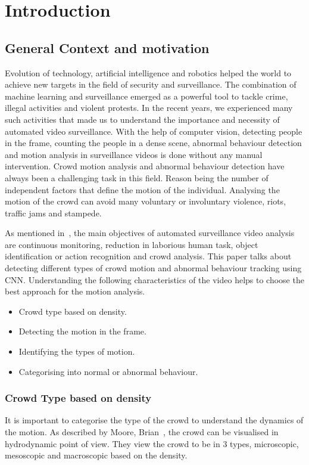 \chapter{Introduction}
\section{General Context and motivation}
Evolution of technology, artificial intelligence and robotics helped the world to achieve new targets in the
field of security and surveillance. The combination of machine learning and surveillance emerged as a
powerful tool to tackle crime, illegal activities and violent protests. In the recent years, we experienced 
many such activities that made us to understand the importance and necessity of automated video 
surveillance. With the help of computer vision, detecting people in the frame, counting the people in a 
dense scene, abnormal behaviour detection and motion analysis in surveillance videos is done without 
any manual intervention. Crowd motion analysis and abnormal behaviour detection have always been a 
challenging task in this field. Reason being the number of independent factors that define the motion of 
the individual. Analysing the motion of the crowd can avoid many voluntary or involuntary violence, riots, 
traffic jams and stampede.

As mentioned in~\cite{sreenu2019intelligent}, the main objectives of automated surveillance video 
analysis are continuous monitoring, reduction in laborious human task, object identification or action 
recognition and crowd analysis. This paper talks about detecting different types of crowd motion and abnormal behaviour tracking using CNN. Understanding the following characteristics of the video helps to choose the best approach for the motion analysis.
\begin{itemize}
	\item Crowd type based on density.
	\item Detecting the motion in the frame.
	\item Identifying the types of motion.
	\item Categorising into normal or abnormal behaviour.
\end{itemize}
\subsection{Crowd Type based on density}
It is important to categorise the type of the crowd to understand the dynamics of the motion. As described by Moore, Brian~\cite{moore2011visual}, the crowd can be visualised in hydrodynamic point of view. They view the crowd to be in 3 types, microscopic, mesoscopic and macroscopic based on the density. 

